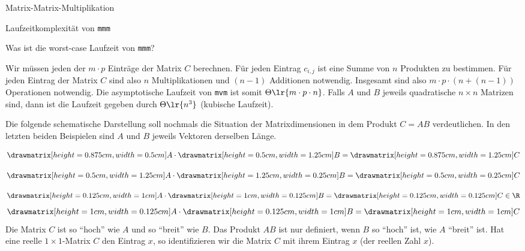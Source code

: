 \begin{frame}[fragile]{Matrix-Matrix-Multiplikation}
		\leavevmode
		
\end{frame}

\begin{frame}{Laufzeitkomplexität von \texttt{mmm}}
	\begin{myexercise}
		Was ist die worst-case Laufzeit von \texttt{mmm}?
	\end{myexercise}
\end{frame}

\begin{frame}
	\begin{myanswer}
		Wir müssen jeden der $m\cdot p$ Einträge der Matrix $C$ berechnen. Für jeden Eintrag $c_{i,j}$ ist eine Summe von $n$ Produkten zu bestimmen. Für jeden Eintrag der Matrix $C$ sind also $n$ Multiplikationen und $(n-1)$ Additionen notwendig. Insgesamt sind also $m \cdot p \cdot (n + (n-1))$ Operationen notwendig. Die asymptotische Laufzeit von \texttt{mvm} ist somit $\Theta\lr{m \cdot p \cdot  n}$. Falls $A$ und $B$ jeweils quadratische $n\times n$ Matrizen sind, dann ist die Laufzeit gegeben durch $\Theta\lr{n^3}$ (kubische Laufzeit).
	\end{myanswer}
\end{frame}

\begin{frame}
	Die folgende schematische Darstellung soll nochmals die Situation der Matrixdimensionen in dem Produkt $C = AB$ verdeutlichen. In den letzten beiden Beispielen sind $A$ und $B$ jeweils Vektoren derselben Länge.
\end{frame}

\begin{frame}
\[
\drawmatrix[height=0.875cm,width=0.5cm]A
\cdot 
\drawmatrix[height=0.5cm,width=1.25cm]B
=
\drawmatrix[height=0.875cm,width=1.25cm]C
\]

\[
\drawmatrix[height=0.5cm,width=1.25cm]A
\cdot 
\drawmatrix[height=1.25cm,width=0.25cm]B
=
\drawmatrix[height=0.5cm,width=0.25cm]C
\]

\[
\drawmatrix[height=0.125cm,width=1cm]A
\cdot 
\drawmatrix[height=1cm,width=0.125cm]B
=
\drawmatrix[height=0.125cm,width=0.125cm]C\in\R
\]
\[
\drawmatrix[height=1cm,width=0.125cm]A
\cdot 
\drawmatrix[height=0.125cm,width=1cm]B
=
\drawmatrix[height=1cm,width=1cm]C
\]
Die Matrix $C$ ist so \enquote{hoch} wie $A$ und so \enquote{breit} wie $B$. Das Produkt $AB$ ist nur definiert, wenn $B$ so \enquote{hoch} ist, wie $A$ \enquote{breit} ist. Hat eine reelle $1\times 1$-Matrix $C$ den Eintrag $x$, so identifizieren wir die Matrix $C$ mit ihrem Eintrag $x$ (der reellen Zahl $x$).
\end{frame}


